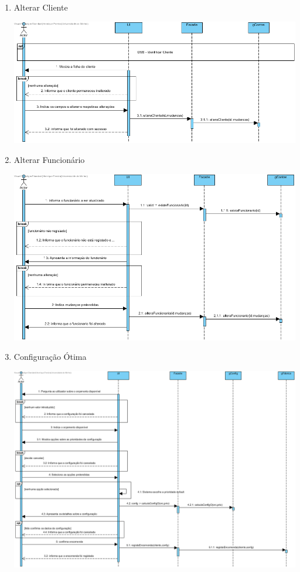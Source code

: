 \documentclass[11pt]{article} %
\begin{document}
\begin{enumerate}
\begin{center}
		\end{center}\newpage
	\item Alterar Cliente
		\begin{center}
 			\includegraphics[width = 6in]{dsss_alterar_cliente.png}
		\end{center}
	\item Alterar Funcionário
		\begin{center}
 			\includegraphics[width = 6in]{dsss_alterar_funcionario.png}
		\end{center}\newpage
	\item Configuração Ótima
		\begin{center}
 			\includegraphics[width = 6in]{dsss_configuracao_otima.png}

\end{center}
\end{enumerate}
\end{document}
